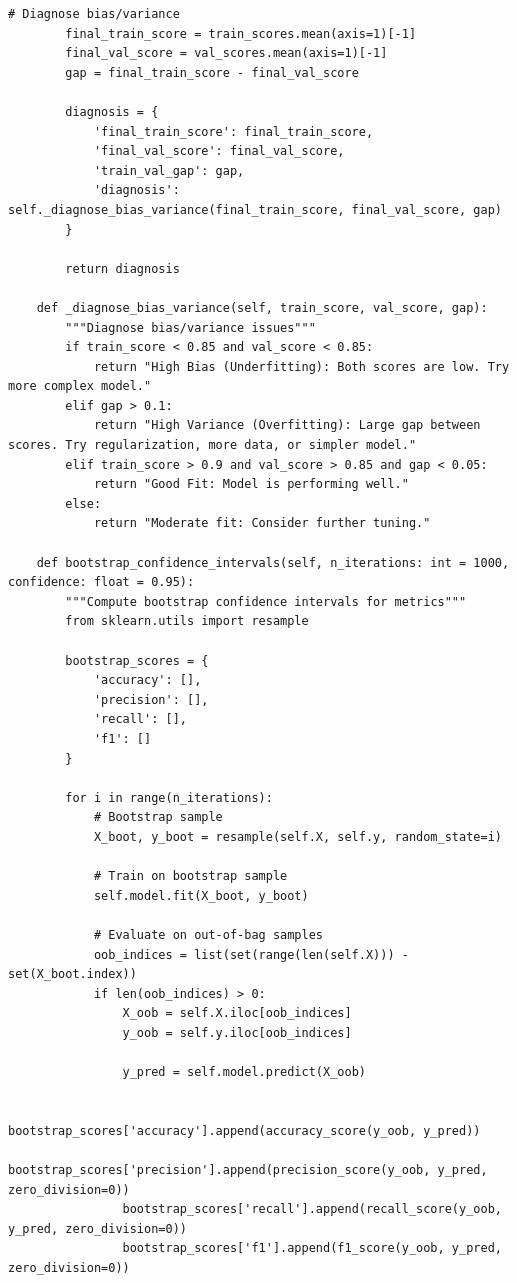 \begin{lstlisting}[style=python, caption=Comprehensive model validation framework]
        # Diagnose bias/variance
        final_train_score = train_scores.mean(axis=1)[-1]
        final_val_score = val_scores.mean(axis=1)[-1]
        gap = final_train_score - final_val_score

        diagnosis = {
            'final_train_score': final_train_score,
            'final_val_score': final_val_score,
            'train_val_gap': gap,
            'diagnosis': self._diagnose_bias_variance(final_train_score, final_val_score, gap)
        }

        return diagnosis

    def _diagnose_bias_variance(self, train_score, val_score, gap):
        """Diagnose bias/variance issues"""
        if train_score < 0.85 and val_score < 0.85:
            return "High Bias (Underfitting): Both scores are low. Try more complex model."
        elif gap > 0.1:
            return "High Variance (Overfitting): Large gap between scores. Try regularization, more data, or simpler model."
        elif train_score > 0.9 and val_score > 0.85 and gap < 0.05:
            return "Good Fit: Model is performing well."
        else:
            return "Moderate fit: Consider further tuning."

    def bootstrap_confidence_intervals(self, n_iterations: int = 1000, confidence: float = 0.95):
        """Compute bootstrap confidence intervals for metrics"""
        from sklearn.utils import resample

        bootstrap_scores = {
            'accuracy': [],
            'precision': [],
            'recall': [],
            'f1': []
        }

        for i in range(n_iterations):
            # Bootstrap sample
            X_boot, y_boot = resample(self.X, self.y, random_state=i)

            # Train on bootstrap sample
            self.model.fit(X_boot, y_boot)

            # Evaluate on out-of-bag samples
            oob_indices = list(set(range(len(self.X))) - set(X_boot.index))
            if len(oob_indices) > 0:
                X_oob = self.X.iloc[oob_indices]
                y_oob = self.y.iloc[oob_indices]

                y_pred = self.model.predict(X_oob)

                bootstrap_scores['accuracy'].append(accuracy_score(y_oob, y_pred))
                bootstrap_scores['precision'].append(precision_score(y_oob, y_pred, zero_division=0))
                bootstrap_scores['recall'].append(recall_score(y_oob, y_pred, zero_division=0))
                bootstrap_scores['f1'].append(f1_score(y_oob, y_pred, zero_division=0))


\end{lstlisting}
